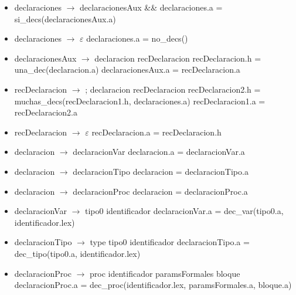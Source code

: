 \documentclass[11pt]{article}
\begin{document}
        \begin{itemize}
            \item declaraciones $\rightarrow$ declaracionesAux \&\&
                \subitem declaraciones.a = si\_decs(declaracionesAux.a)
            \item declaraciones $\rightarrow$ $\varepsilon$
                \subitem declaraciones.a = no\_decs()
            \item declaracionesAux $\rightarrow$ declaracion recDeclaracion
                \subitem recDeclaracion.h = una\_dec(declaracion.a)
                \subitem declaracionesAux.a = recDeclaracion.a
            \item recDeclaracion $\rightarrow$ ; declaracion recDeclaracion
                \subitem recDeclaracion2.h = muchas\_decs(recDeclaracion1.h, declaraciones.a)
                \subitem recDeclaracion1.a = recDeclaracion2.a
            \item recDeclaracion $\rightarrow$ $\varepsilon$
                \subitem recDeclaracion.a = recDeclaracion.h
            \item declaracion $\rightarrow$ declaracionVar
                \subitem declaracion.a = declaracionVar.a
            \item declaracion $\rightarrow$ declaracionTipo
                \subitem declaracion = declaracionTipo.a
            \item declaracion $\rightarrow$ declaracionProc
                \subitem declaracion = declaracionProc.a
            \item declaracionVar $\rightarrow$ tipo0 identificador
                \subitem declaracionVar.a = dec\_var(tipo0.a, identificador.lex)
            \item declaracionTipo $\rightarrow$ type tipo0 identificador
                \subitem declaracionTipo.a = dec\_tipo(tipo0.a, identificador.lex)
            \item declaracionProc $\rightarrow$ proc identificador paramsFormales bloque
                \subitem declaracionProc.a = dec\_proc(identificador.lex, paramsFormales.a, bloque.a)
        \end{itemize}
        \
\end{document}
